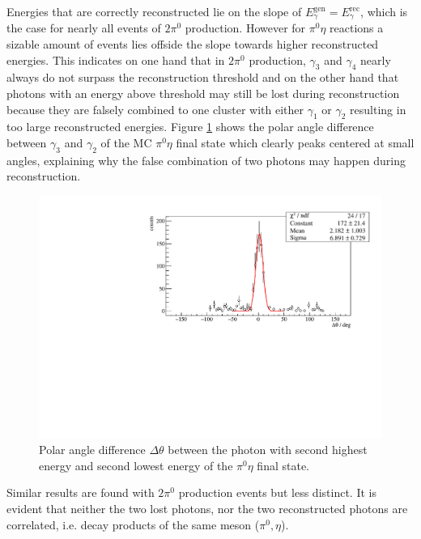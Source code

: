 Energies that are correctly reconstructed lie on the slope of $E_\gamma^\text{gen}=E_\gamma^\text{rec}$, which is the case for nearly all events of $2\pi^0$ production. However for $\pi^0\eta$ reactions a sizable amount of events lies offside the slope towards higher reconstructed energies. This indicates on one hand that in $2\pi^0$ production, $\gamma_3$ and $\gamma_4$ nearly always do not surpass the reconstruction threshold and on the other hand that photons with an energy above threshold may still be lost during reconstruction because they are falsely combined to one cluster with either $\gamma_1$ or $\gamma_2$ resulting in too large reconstructed energies. Figure \ref{fig:mcangle} shows the polar angle difference between $\gamma_3$ and $\gamma_2$ of the MC $\pi^0\eta$ final state which clearly peaks centered at small angles, explaining why the false combination of two photons may happen during reconstruction.
\begin{figure}[htbp]
	\centering
	\includegraphics[width=\linewidth]{../figs/hydrogen/mcgammas_td_pi0eta.pdf}
	\caption{Polar angle difference $\Delta\theta$ between the photon with second highest energy and second lowest energy of the $\pi^0\eta$ final state.}
	\label{fig:mcangle}
\end{figure}
Similar results are found with $2\pi^0$ production events but less distinct. It is evident that neither the two lost photons, nor the two reconstructed photons are correlated, i.e. decay products of the same meson ($\pi^0,\eta$).

